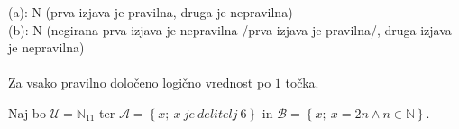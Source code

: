 \documentclass[addpoints]{exam}
\begin{document}
\begin{questions}
    \begin{solution}
        (a): N (prva izjava je pravilna, druga je nepravilna) \\
        (b): N (negirana prva izjava je nepravilna /prva izjava je pravilna/, druga izjava je nepravilna) \\ \\
        Za vsako pravilno določeno logično vrednost po $1$ točka.
    \end{solution}



    \newpage

    \question
    Naj bo $\mathcal{U}=\mathbb{N}_{11}$ ter $\mathcal{A}=\left\{x;\ x~ je~ delitelj~ 6\right\}$ in $\mathcal{B}=\left\{x;\ x=2n\land n\in\mathbb{N}\right\}$.



\end{questions}
\end{document}
